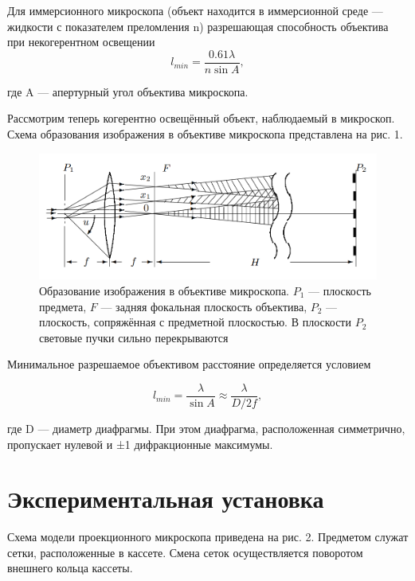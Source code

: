 \documentclass[a4paper,12pt]{article} %
\begin{document}
\noindent Для иммерсионного микроскопа (объект находится в иммерсионной среде — жидкости с показателем преломления n) разрешающая способность объектива при некогерентном освещении
\begin{equation}
    l_{min} = \frac{0.61 \lambda}{n \sin A},
\end{equation}

\noindent где A — апертурный угол объектива микроскопа. 

\medskip

\noindent Рассмотрим теперь когерентно освещённый объект, наблюдаемый в микроскоп. Схема образования изображения в объективе микроскопа
представлена на рис. 1.
    \begin{figure}[h]
    \centering
    \includegraphics[width=15cm]{fig2.PNG}
    \caption{Образование изображения в объективе микроскопа. $P_1$ — плоскость предмета, $F$ — задняя фокальная плоскость объектива, $P_2$ — плоскость,
сопряжённая с предметной плоскостью. В плоскости $P_2$ световые пучки
сильно перекрываются}
    \label{fig:vac}
\end{figure}

\noindent Минимальное разрешаемое объективом расстояние
определяется условием

\begin{equation}
    l_{min} = \frac{\lambda}{\sin A} \approx \frac{\lambda}{D/2f},
\end{equation}

\noindent где D — диаметр диафрагмы. При этом диафрагма, расположенная
симметрично, пропускает нулевой и ±1 дифракционные максимумы.


\section{Экспериментальная установка}

\noindent Схема модели проекционного микроскопа приведена на рис. 2. Предметом служат сетки, расположенные
в кассете. Смена сеток осуществляется поворотом внешнего кольца кассеты.
\end{document}
